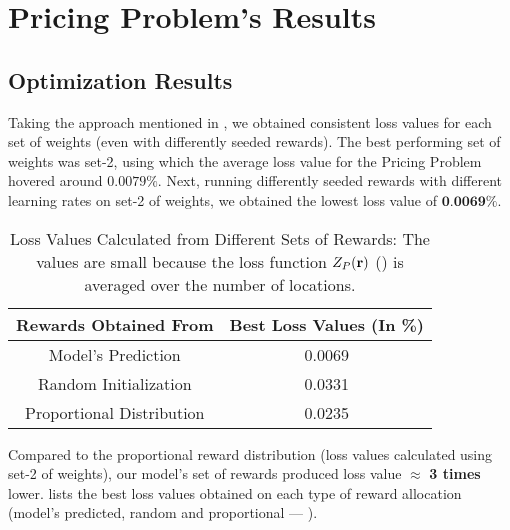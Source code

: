 \section{Pricing Problem's Results} \label{sec:Pricing Problem's Results}
\subsection{Optimization Results} \label{sec:PriProbRes - Optimization}
Taking the approach mentioned in , we obtained consistent loss values for each set of weights (even with differently seeded rewards). The best performing set of weights was set-2, using which the average loss value for the Pricing Problem hovered around $0.0079\%$. Next, running differently seeded rewards with different learning rates on set-2 of weights, we obtained the lowest loss value of $\textbf{0.0069\%}$.
\begin{table}[!htbp]
    \centering
    \caption[Loss Values Calculated from Different Sets of Rewards]{Loss Values Calculated from Different Sets of Rewards: The values are small because the loss function $Z_P(\mathbf{r})$ () is averaged over the number of locations.}
    \label{tab:Loss Values Calculated from Different Sets of Rewards}
    \begin{tabular}{|c|c|}
        \hline
        \textbf{Rewards Obtained From} & \textbf{Best Loss Values (In \%)}\\
        \hline
        Model's Prediction & 0.0069\\
        Random Initialization & 0.0331\\
        Proportional Distribution & 0.0235\\
        \hline
    \end{tabular}
\end{table}

Compared to the proportional reward distribution (loss values calculated using set-2 of weights), our model's set of rewards produced loss value $\approx$ \textbf{3 times} lower.  lists the best loss values obtained on each type of reward allocation (model's predicted, random and proportional --- ).

